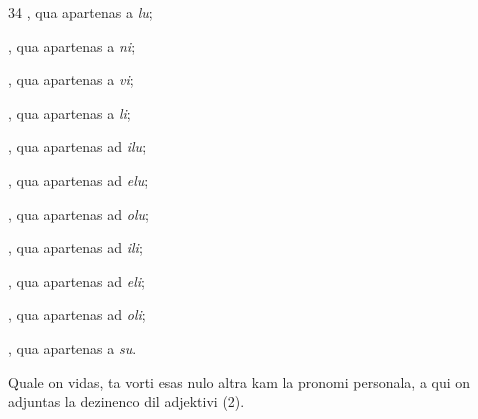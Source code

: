 \begin{VUpage}[38]{34}
, qua apartenas a \textit{lu};

, qua apartenas a \textit{ni};

, qua apartenas a \textit{vi};

, qua apartenas a \textit{li};

, qua apartenas ad \textit{ilu};

, qua apartenas ad \textit{elu};

, qua apartenas ad \textit{olu};

, qua apartenas ad \textit{ili};

, qua apartenas ad \textit{eli};

, qua apartenas ad \textit{oli};

, qua apartenas a \textit{su}.

\VUblanc{4.04pt}%
Quale on vidas, ta vorti esas nulo altra kam la pronomi\nl
personala, a qui on adjuntas la dezinenco  dil adjektivi (2).
\parplein
\end{VUpage}

